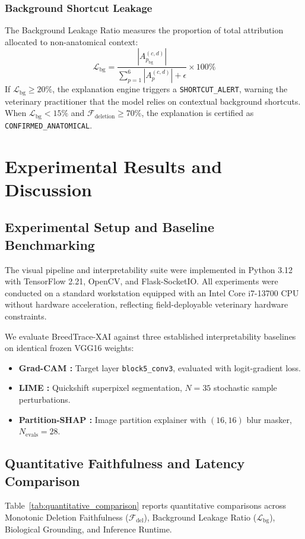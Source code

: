 \documentclass[conference]{IEEEtran}
\begin{document}
\subsubsection{Background Shortcut Leakage}
The Background Leakage Ratio measures the proportion of total attribution allocated to non-anatomical context:
\begin{equation}
\mathcal{L}_{\text{bg}} = \frac{|A_{p_{\text{bg}}}^{(c,d)}|}{\sum_{p=1}^6 |A_p^{(c,d)}| + \epsilon} \times 100\%
\end{equation}
If $\mathcal{L}_{\text{bg}} \ge 20\%$, the explanation engine triggers a \texttt{SHORTCUT\_ALERT}, warning the veterinary practitioner that the model relies on contextual background shortcuts. When $\mathcal{L}_{\text{bg}} < 15\%$ and $\mathcal{F}_{\text{deletion}} \ge 70\%$, the explanation is certified as \texttt{CONFIRMED\_ANATOMICAL}.

\section{Experimental Results and Discussion}

\subsection{Experimental Setup and Baseline Benchmarking}
The visual pipeline and interpretability suite were implemented in Python 3.12 with TensorFlow 2.21, OpenCV, and Flask-SocketIO. All experiments were conducted on a standard workstation equipped with an Intel Core i7-13700 CPU without hardware acceleration, reflecting field-deployable veterinary hardware constraints.

We evaluate BreedTrace-XAI against three established interpretability baselines on identical frozen VGG16 weights:
\begin{itemize}
    \item \textbf{Grad-CAM \cite{selvaraju2017gradcam}:} Target layer \texttt{block5\_conv3}, evaluated with logit-gradient loss.
    \item \textbf{LIME \cite{ribeiro2016lime}:} Quickshift superpixel segmentation, $N=35$ stochastic sample perturbations.
    \item \textbf{Partition-SHAP \cite{lundberg2017shap}:} Image partition explainer with $(16, 16)$ blur masker, $N_{\text{evals}}=28$.
\end{itemize}

\subsection{Quantitative Faithfulness and Latency Comparison}
Table~\ref{tab:quantitative_comparison} reports quantitative comparisons across Monotonic Deletion Faithfulness ($\mathcal{F}_{\text{del}}$), Background Leakage Ratio ($\mathcal{L}_{\text{bg}}$), Biological Grounding, and Inference Runtime.
\end{document}

